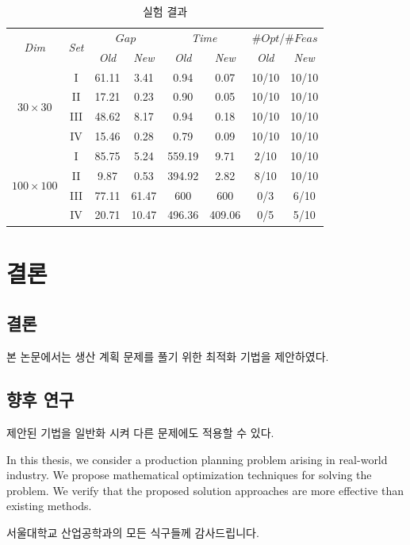 \documentclass[oneside, ko,ms]{snuthesis_utf8_kor}
\begin{document}
\begin{table}[h]
\centering
\begin{footnotesize}
\caption{실험 결과}
\begin{tabular}{@{}cc||cc|cc|cc@{}}
\toprule
\multirow{2}{*}{\textit{Dim}} & \multirow{2}{*}{\textit{Set}}  & \multicolumn{2}{c|}{$Gap$} & \multicolumn{2}{c|}{\textit{Time}}& \multicolumn{2}{c}{\#$Opt$/\#$Feas$}\\
&& \textit{Old} & \textit{New}& \textit{Old} & \textit{New}& \textit{Old} & \textit{New}\\
\hline
\multirow{4}{*}{$30\times30$} & I& 61.11 	&3.41 	&0.94 	&0.07 	&10/10	&10/10\\
& II&	17.21 	&0.23  		&0.90 	&0.05 	&10/10	&10/10\\
& III&	48.62 	&8.17  	 	&0.94 	&0.18 	&10/10	&10/10\\
& IV&	15.46 	&0.28 		&0.79 	&0.09 	&10/10	&10/10\\
\hline
\multirow{4}{*}{$100\times 100$} & I&85.75 	&5.24 		&559.19 	&9.71 	&2/10	&10/10\\
&II&9.87 	&0.53 		&394.92 	&2.82 	&8/10	&10/10\\
&III&77.11 	&61.47  	&600 	&600 	&0/3	&6/10\\
&IV&20.71 	&10.47	&496.36 	&409.06 	&0/5	&5/10\\
\bottomrule
\end{tabular}
\label{tb2}
\end{footnotesize}
\end{table}

\chapter{결론}\label{c5}
\section{결론}\label{s5.1}
본 논문에서는 생산 계획 문제를 풀기 위한 최적화 기법을 제안하였다.
\section{향후 연구}\label{s5.2}
제안된 기법을 일반화 시켜 다른 문제에도 적용할 수 있다.



\begin{bibpage}

\nocite{*}
\end{bibpage}

\begin{abstractalt}
In this thesis, we consider a production planning problem arising in real-world industry. We propose mathematical optimization techniques for solving the problem. We verify that the proposed solution approaches are more effective than existing methods.
\end{abstractalt}

\acknowledgement{}
서울대학교 산업공학과의 모든 식구들께 감사드립니다.
\end{document}
